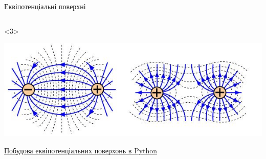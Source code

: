 \documentclass{beamer}
\begin{document}
\begin{frame}{Еквіпотенціальні поверхні}
\begin{onlyenv}
\begin{columns}
\begin{column}{0.5\linewidth}
\begin{center}
				\end{center}
			\end{column}
		\end{columns}
	\end{onlyenv}
	\begin{onlyenv}
		\begin{center}
			\includegraphics[width=1\linewidth]{fieldlines}
		\end{center}
		\href{https://drive.google.com/file/d/1vyp5EpchboRtNrRVEHsv4h_Tsy6TSmQd/view?usp=sharing}{Побудова
			еквіпотенціальних поверхонь в Python}
	\end{onlyenv}
\end{frame}
\end{document}
